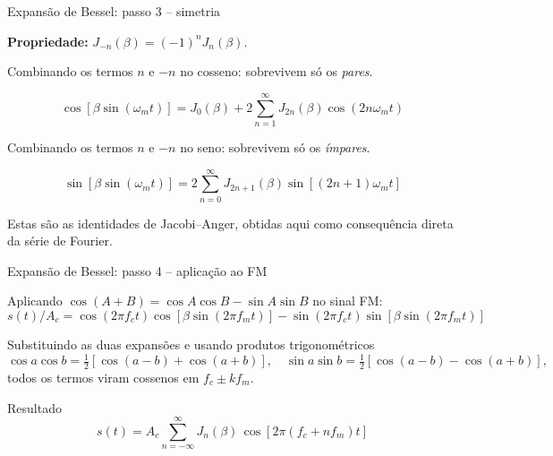 
\begin{frame}{Expansão de Bessel: passo 3 -- simetria}

\textbf{Propriedade:} $J_{-n}(\beta) = (-1)^n J_n(\beta)$.

\vspace{0.2cm}
Combinando os termos $n$ e $-n$ no cosseno: sobrevivem só os \emph{pares}.

\[
\boxed{\,\cos[\beta\sin(\omega_m t)] = J_0(\beta) + 2\!\sum_{n=1}^{\infty}\! J_{2n}(\beta)\cos(2n\omega_m t)\,}
\]

\pause
Combinando os termos $n$ e $-n$ no seno: sobrevivem só os \emph{ímpares}.

\[
\boxed{\,\sin[\beta\sin(\omega_m t)] = 2\!\sum_{n=0}^{\infty}\! J_{2n+1}(\beta)\sin[(2n+1)\omega_m t]\,}
\]

\pause
Estas são as identidades de Jacobi--Anger, obtidas aqui como consequência direta da série de Fourier.

\end{frame}


\begin{frame}{Expansão de Bessel: passo 4 -- aplicação ao FM}

Aplicando $\cos(A+B) = \cos A\cos B - \sin A\sin B$ no sinal FM:
\[
s(t)/A_c = \cos(2\pi f_c t)\cos[\beta\sin(2\pi f_m t)] - \sin(2\pi f_c t)\sin[\beta\sin(2\pi f_m t)]
\]

\pause
Substituindo as duas expansões e usando produtos trigonométricos
\[
\cos a\cos b = \tfrac{1}{2}[\cos(a-b)+\cos(a+b)],\quad
\sin a\sin b = \tfrac{1}{2}[\cos(a-b)-\cos(a+b)],
\]
todos os termos viram cossenos em $f_c \pm k f_m$.

\pause
\begin{block}{Resultado}
\[
s(t) = A_c\!\sum_{n=-\infty}^{\infty}\! J_n(\beta)\,\cos[2\pi(f_c + n f_m)t]
\]
\end{block}

\end{frame}


